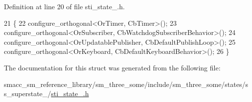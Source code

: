 Definition at line 20 of file sti\+\_\+state\+\_.\+h.


\begin{DoxyCode}
21   \{
22     configure\_orthogonal<OrTimer, CbTimer>();
23     configure\_orthogonal<OrSubscriber, CbWatchdogSubscriberBehavior>();
24     configure\_orthogonal<OrUpdatablePublisher, CbDefaultPublishLoop>();
25     configure\_orthogonal<OrKeyboard, CbDefaultKeyboardBehavior>();
26   \}
\end{DoxyCode}


The documentation for this struct was generated from the following file\+:\begin{DoxyCompactItemize}
\item 
smacc\+\_\+sm\+\_\+reference\+\_\+library/sm\+\_\+three\+\_\+some/include/sm\+\_\+three\+\_\+some/states/ss\+\_\+superstate\+\_/\hyperlink{sti__state__2_8h}{sti\+\_\+state\+\_.\+h}\end{DoxyCompactItemize}
